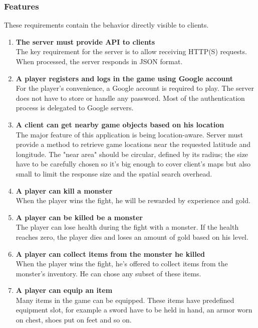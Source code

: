 		\subsubsection*{Features}
		These requirements contain the behavior directly visible to clients.
		\begin{enumerate}
			\item \textbf{The server must provide API to clients} \\
			The key requirement for the server is to allow receiving HTTP(S) requests. When processed, the server responds in JSON format.
			
			\item \textbf{A player registers and logs in the game using Google account} \\
			For the player's convenience, a Google account is required to play. The server does not have to store or handle any password. Most of the authentication process is delegated to Google servers.
			
			\item \textbf{A client can get nearby game objects based on his location} \\
			The major feature of this application is being location-aware. Server must provide a method to retrieve game locations near the requested latitude and longitude. The "near area" should be circular, defined by its radius; the size have to be carefully chosen so it's big enough to cover client's maps but also small to limit the response size and the spatial search overhead.
			
			\item \textbf{A player can kill a monster} \\
			When the player wins the fight, he will be rewarded by experience and gold. 			
			
			\item \textbf{A player can be killed be a monster} \\
			The player can lose health during the fight with a monster. If the health reaches zero, the player dies and loses an amount of gold based on his level.
			
			\item \textbf{A player can collect items from the monster he killed} \\
			When the player wins the fight, he's offered to collect items from the monster's inventory. He can chose any subset of these items.
			
			\item \textbf{A player can equip an item} \\	
			Many items in the game can be equipped. These items have predefined equipment slot, for example a sword have to be held in hand, an armor worn on chest, shoes put on feet and so on.
						

\end{enumerate}
